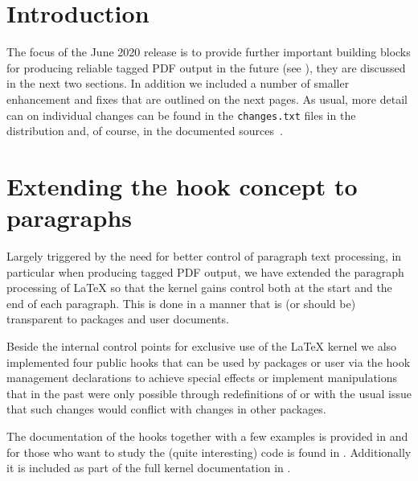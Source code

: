 \documentclass{ltnews}
\providecommand\tubcommand[1]{}
\begin{document}
\tubcommand{\addtolength\textheight{4.2pc}}   %

\maketitle
{ \spaceskip=3.33pt  \tableofcontents}

\setlength{}


\medskip


\section{Introduction}

The focus of the June 2020 release is to provide further important
building blocks for producing reliable tagged PDF output in the future
(see \cite{33:blueprint}), they are discussed in the next two
sections. In addition we included a number of smaller enhancement and
fixes that are outlined on the next pages. As usual, more detail can
on individual changes can be found in the \texttt{changes.txt} files
in the distribution and, of course, in the documented
sources~\cite{33:source2e}.




\section{Extending the hook concept to paragraphs}

Largely triggered by the need for better control of paragraph text
processing, in particular when producing tagged PDF output, we have
extended the paragraph processing of \LaTeX{} so that the kernel gains
control both at the start and the end of each paragraph. This is done
in a manner that is (or should be) transparent to packages and user
documents.

Beside the internal control points for exclusive use of the \LaTeX{}
kernel we also implemented four public hooks that can be used by
packages or user via the hook management declarations to achieve
special effects or implement manipulations that in the past were only
possible through redefinitions of  or  with the
usual issue that such changes would conflict with changes in other
packages.

The documentation of the hooks together with a few examples is
provided in  and for those who want to study the
(quite interesting) code is found in
. Additionally it is included as part of the
full kernel documentation in .
\end{document}
